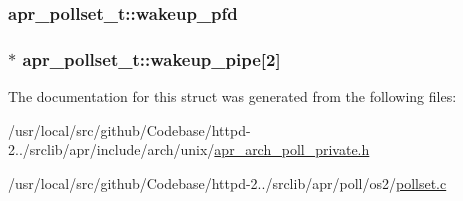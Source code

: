 \subsubsection[{\texorpdfstring{wakeup\+\_\+pfd}{wakeup_pfd}}]{ apr\+\_\+pollset\+\_\+t\+::wakeup\+\_\+pfd}\hypertarget{structapr__pollset__t_ab7f6b91ff333eeb4911ab41c44d3344a}{}\label{structapr__pollset__t_ab7f6b91ff333eeb4911ab41c44d3344a}
\subsubsection[{\texorpdfstring{wakeup\+\_\+pipe}{wakeup_pipe}}]{$\ast$ apr\+\_\+pollset\+\_\+t\+::wakeup\+\_\+pipe\mbox{[}2\mbox{]}}\hypertarget{structapr__pollset__t_a21a78faacdf6e329c9333220a3b69307}{}\label{structapr__pollset__t_a21a78faacdf6e329c9333220a3b69307}


The documentation for this struct was generated from the following files\+:\begin{DoxyCompactItemize}
\item 
/usr/local/src/github/\+Codebase/httpd-\/2../srclib/apr/include/arch/unix/\hyperlink{apr__arch__poll__private_8h}{apr\+\_\+arch\+\_\+poll\+\_\+private.\+h}\item 
/usr/local/src/github/\+Codebase/httpd-\/2../srclib/apr/poll/os2/\hyperlink{os2_2pollset_8c}{pollset.\+c}\end{DoxyCompactItemize}
